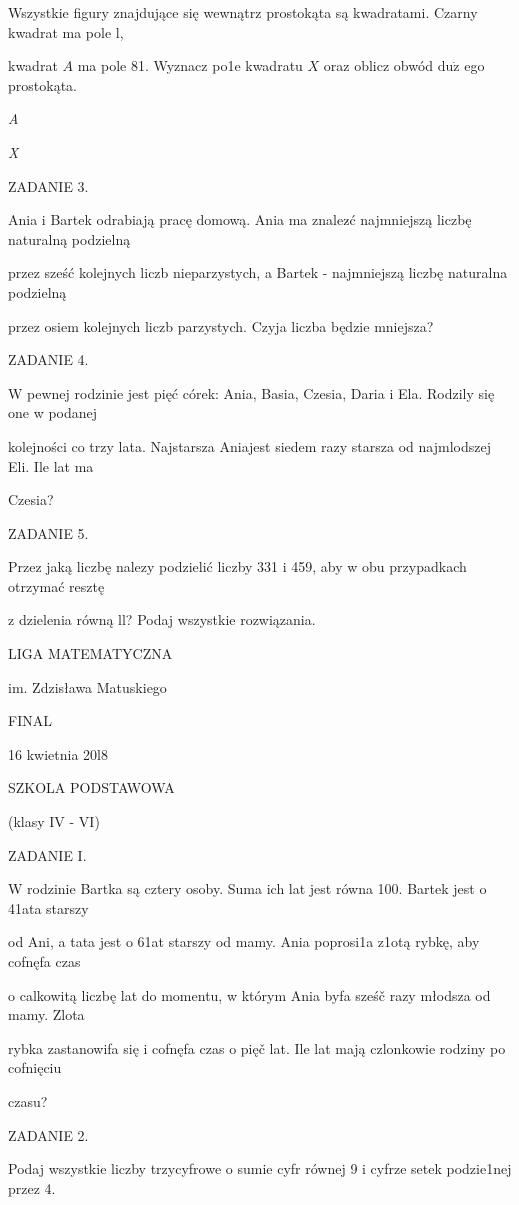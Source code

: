 \documentclass[a4paper,12pt]{article}
\begin{document}
Wszystkie figury znajdujące się wewnątrz prostokąta są kwadratami. Czarny kwadrat ma pole l,

kwadrat $A$ ma pole 81. Wyznacz po1e kwadratu $X$ oraz oblicz obwód $\mathrm{d}\mathrm{u}\dot{\mathrm{z}}$ ego prostokąta.

{\it A}

{\it X}

ZADANIE 3.

Ania i Bartek odrabiają pracę domową. Ania ma znalez$\acute{}$ć najmniejszą liczbę naturalną podzielną

przez sześć kolejnych liczb nieparzystych, a Bartek - najmniejszą liczbę naturalna podzielną

przez osiem kolejnych liczb parzystych. Czyja liczba będzie mniejsza?

ZADANIE 4.

W pewnej rodzinie jest pięć córek: Ania, Basia, Czesia, Daria i Ela. Rodzily się one w podanej

kolejności co trzy lata. Najstarsza Aniajest siedem razy starsza od najmlodszej Eli. Ile lat ma

Czesia?

ZADANIE 5.

Przez jaką liczbę nalezy podzielić liczby 331 i 459, aby w obu przypadkach otrzymać resztę

z dzielenia równą ll? Podaj wszystkie rozwiązania.






LIGA MATEMATYCZNA

im. Zdzisława Matuskiego

FINAL

16 kwietnia 20l8

SZKOLA PODSTAWOWA

(klasy IV - VI)

ZADANIE I.

W rodzinie Bartka są cztery osoby. Suma ich lat jest równa 100. Bartek jest o 41ata starszy

od Ani, a tata jest o 61at starszy od mamy. Ania poprosi1a z1otą rybkę, aby cofnęfa czas

o calkowitą liczbę lat do momentu, w którym Ania byfa sześč razy młodsza od mamy. Zlota

rybka zastanowifa się i cofnęfa czas o pięč lat. Ile lat mają czlonkowie rodziny po cofnięciu

czasu?

ZADANIE 2.

Podaj wszystkie liczby trzycyfrowe o sumie cyfr równej 9 i cyfrze setek podzie1nej przez 4.
\end{document}
